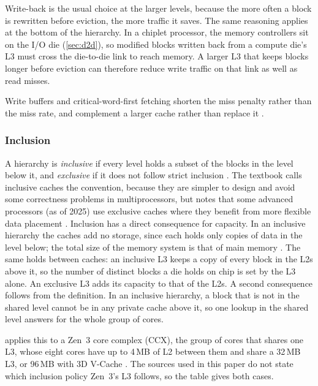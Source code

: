 Write-back is the usual choice at the larger levels, because the more often a block is rewritten before eviction, the more traffic it saves. The same reasoning applies at the bottom of the hierarchy. In a chiplet processor, the memory controllers sit on the I/O die (\cref{sec:d2d}), so modified blocks written back from a compute die's L3 must cross the die-to-die link to reach memory. A larger L3 that keeps blocks longer before eviction can therefore reduce write traffic on that link as well as read misses.

Write buffers and critical-word-first fetching shorten the miss penalty rather than the miss rate, and complement a larger cache rather than replace it \cite[sec.~11.3.3]{sarangi2025basic}.

\subsubsection*{Inclusion}
A hierarchy is \emph{inclusive} if every level holds a subset of the blocks in the level below it, and \emph{exclusive} if it does not follow strict inclusion \cite[sec.~11.1.7, Definition~100]{sarangi2025basic}. The textbook calls inclusive caches the convention, because they are simpler to design and avoid some correctness problems in multiprocessors, but notes that some advanced processors (as of 2025) use exclusive caches where they benefit from more flexible data placement \cite[sec.~11.1.7]{sarangi2025basic}. Inclusion has a direct consequence for capacity. In an inclusive hierarchy the caches add no storage, since each holds only copies of data in the level below; the total size of the memory system is that of main memory \cite[sec.~11.3]{sarangi2025basic}. The same holds between caches: an inclusive L3 keeps a copy of every block in the L2s above it, so the number of distinct blocks a die holds on chip is set by the L3 alone. An exclusive L3 adds its capacity to that of the L2s. A second consequence follows from the definition. In an inclusive hierarchy, a block that is not in the shared level cannot be in any private cache above it, so one lookup in the shared level answers for the whole group of cores.

 applies this to a Zen~3 core complex (CCX), the group of cores that shares one L3, whose eight cores have up to 4\,MB of L2 between them and share a 32\,MB L3, or 96\,MB with 3D V-Cache \cite[sec.~2.2]{amd2022epyc7003}. The sources used in this paper do not state which inclusion policy Zen~3's L3 follows, so the table gives both cases.

